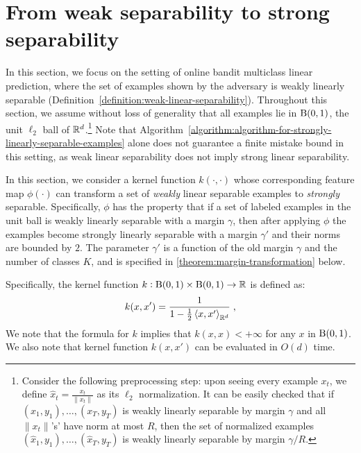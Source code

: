 \section{From weak separability to strong separability}
\label{section:from-weak-separability-to-strong-separability}

In this section, we focus on the setting of online bandit multiclass
linear prediction, where the set of examples shown by the adversary is weakly
linearly separable (Definition~\ref{definition:weak-linear-separability}).
Throughout this section, we assume without loss of generality that
all examples lie in $\operatorname{B}(0,1)$, the unit $\ell_2$ ball of
$\mathbb{R}^d$.\footnote{Consider the following preprocessing step: upon seeing every
example $x_t$, we define $\hat{x}_t = \frac{x_t}{\|x_t\|}$ as its $\ell_2$ normalization.
It can be easily checked that if $(x_1,y_1), \ldots, (x_T,y_T)$ is weakly linearly
separable by margin $\gamma$ and all $\| x_t \|$'s' have norm at most $R$, then the set of
normalized examples $(\hat{x}_1,y_1), \ldots, (\hat{x}_T,y_T)$ is weakly linearly
separable by margin $\gamma/R$.}
Note that Algorithm~\ref{algorithm:algorithm-for-strongly-linearly-separable-examples}
alone does not guarantee a finite mistake bound in this setting, as weak linear separability
does not imply strong linear separability.


In this section, we consider a kernel function $k(\cdot, \cdot)$
whose corresponding feature map $\phi(\cdot)$ can transform a set of
\emph{weakly} linear separable examples to \emph{strongly} separable.
Specifically, $\phi$
has the property
that if a set of labeled examples in the unit ball is weakly linearly
separable with a margin $\gamma$, then after applying $\phi$ the examples
become strongly linearly separable with a margin $\gamma'$ and their
norms are bounded by $2$. The parameter $\gamma'$ is a function of the old
margin $\gamma$ and the number of classes $K$, and is specified in
\autoref{theorem:margin-transformation} below.

Specifically, the kernel function $k: \operatorname{B}(0,1) \times \operatorname{B}(0,1) \to \mathbb{R}$ is defined as:
$$
k(x,x') = \frac{1}{1 - \frac{1}{2}\left\langle x, x' \right\rangle_{\mathbb{R}^d}} \; ,
$$
We note that the formula for $k$ implies that $k(x,x) < +\infty$ for any $x$ in
$\operatorname{B}(0,1)$. We also note
that kernel function $k(x,x')$ can be evaluated in $O(d)$ time.

